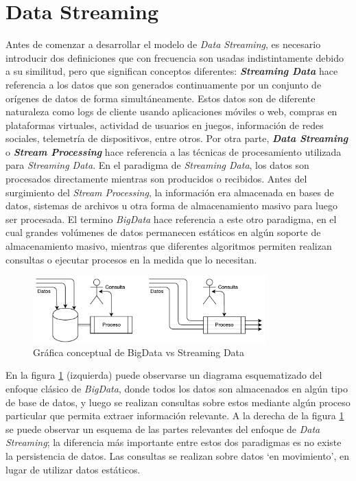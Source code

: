 \documentclass[a4paper,10pt, oneside]{article}
\begin{document}
\newpage

\section{Data Streaming}

Antes de comenzar a desarrollar el modelo de \textit{Data Streaming}, es necesario introducir dos definiciones que con frecuencia son usadas indistintamente debido a su similitud, pero que significan conceptos diferentes: \textbf{\textit{Streaming Data}} hace referencia a los datos que son generados continuamente por un conjunto de orígenes de datos de forma simultáneamente. Estos datos son de diferente naturaleza como logs de cliente usando aplicaciones móviles o web, compras en plataformas virtuales, actividad de usuarios en juegos, información de redes sociales, telemetría de dispositivos, entre otros. Por otra parte, \textbf{\textit{Data Streaming}} o \textbf{\textit{Stream Processing}} hace referencia a las técnicas de procesamiento utilizada para \textit{Streaming Data}. En el paradigma de \textit{Streaming Data}, los datos son procesados directamente mientras son producidos o recibidos. Antes del surgimiento del \textit{Stream Processing}, la información era almacenada en bases de datos, sistemas de archivos u otra forma de almacenamiento masivo para luego ser procesada. El termino \textit{BigData} hace referencia a este otro paradigma, en el cual grandes volúmenes de datos permanecen estáticos en algún soporte de almacenamiento masivo, mientras que diferentes algoritmos permiten realizan consultas o ejecutar procesos en la medida que lo necesitan.

\begin{figure}[htbp]
	\centering
	\includegraphics[width=0.8\textwidth]{./graph/bigdata_vs_streamingdata.pdf}
	\caption{Gráfica conceptual de BigData vs Streaming Data}
	\label{fig:bigdata_vs_streamingdata}
\end{figure}

En la figura \ref{fig:bigdata_vs_streamingdata} (izquierda) puede observarse un diagrama esquematizado del enfoque clásico de \textit{BigData}, donde todos los datos son almacenados en algún tipo de base de datos, y luego se realizan consultas sobre estos mediante algún proceso particular que permita extraer información relevante. A la derecha de la figura \ref{fig:bigdata_vs_streamingdata} se puede observar un esquema de las partes relevantes del enfoque de \textit{Data Streaming}; la diferencia más importante entre estos dos paradigmas es no existe la persistencia de datos. Las consultas se realizan sobre datos `en movimiento', en lugar de utilizar datos estáticos.
\end{document}
